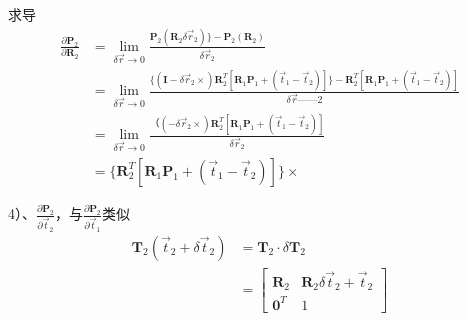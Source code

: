 \documentclass{article}
\begin{document}
求导
\begin{equation}
	\begin{aligned}
		\frac{\partial{\boldsymbol{P}_2}}{\partial{\boldsymbol{R}_2}} & = 
		\lim_{\delta \vec{r}\rightarrow0}\frac{\boldsymbol{P}_2(\boldsymbol{R}_2\delta \vec{r}_2)\}-  \boldsymbol{P}_2(\boldsymbol{R}_2)}                                 
		{\delta \vec{r}_2}\\&=
		\lim_{\delta \vec{r}\rightarrow0}\frac{\{(\boldsymbol{I}-\delta \vec{r}_2\times)\boldsymbol{R}_2^{T}[ \boldsymbol{R}_1\boldsymbol{P}_1 +(\vec{t}_1-\vec{t}_2)]\}- 
		\boldsymbol{R}_2^{T}[ \boldsymbol{R}_1\boldsymbol{P}_1 +(\vec{t}_1-\vec{t}_2)]}{\delta \vec{r} ——2}\\&=
		\lim_{\delta \vec{r}\rightarrow0}\frac{（(-\delta \vec{r}_2\times)\boldsymbol{R}_2^{T}[ \boldsymbol{R}_1\boldsymbol{P}_1 +(\vec{t}_1-\vec{t}_2)]}                 
		{\delta \vec{r} _2}\\&=
		\{\boldsymbol{R}_2^{T}[ \boldsymbol{R}_1\boldsymbol{P}_1 +(\vec{t}_1-\vec{t}_2)]\}\times                                                                             
	\end{aligned}
\end{equation}

4）、$\frac{\partial{\boldsymbol{P}_2}}{\partial{\vec{t}_2}}$，与$\frac{\partial{\boldsymbol{P}_2}}{\partial{\vec{t}_1}}$类似
\begin{equation}
	\begin{aligned}
		\boldsymbol{T}_2(\vec{t}_2+\delta \vec{t}_2) & =                                          
		\boldsymbol{T}_2 \cdot \delta \boldsymbol{T}_2\\&=
		\left[ 
		\begin{matrix} 
		\boldsymbol{R}_2                             & \boldsymbol{R}_2\delta \vec{t}_2+\vec{t}_2 \\
		\boldsymbol{0}^T                             & 1                                          
		\end{matrix}
		\right]
	\end{aligned}
\end{equation}
\end{document}
